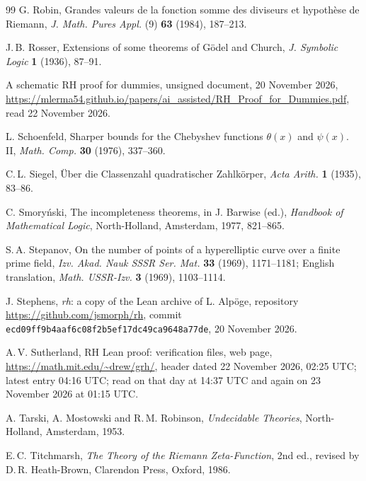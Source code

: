 \documentclass[11pt]{article}
\theoremstyle{definition}
\theoremstyle{remark}
\begin{document}
\begin{thebibliography}{99}
 G. Robin, Grandes valeurs de la fonction somme des diviseurs et hypoth\`ese de Riemann, \emph{J. Math. Pures Appl.} (9) \textbf{63} (1984), 187--213.

 J.\,B. Rosser, Extensions of some theorems of G\"odel and Church, \emph{J. Symbolic Logic} \textbf{1} (1936), 87--91.

 A schematic RH proof for dummies, unsigned document, 20 November 2026, \url{https://mlerma54.github.io/papers/ai_assisted/RH_Proof_for_Dummies.pdf}, read 22 November 2026.

 L. Schoenfeld, Sharper bounds for the Chebyshev functions $\theta(x)$ and $\psi(x)$. II, \emph{Math. Comp.} \textbf{30} (1976), 337--360.

 C.\,L. Siegel, \"Uber die Classenzahl quadratischer Zahlk\"orper, \emph{Acta Arith.} \textbf{1} (1935), 83--86.

 C. Smory\'nski, The incompleteness theorems, in J. Barwise (ed.), \emph{Handbook of Mathematical Logic}, North-Holland, Amsterdam, 1977, 821--865.

 S.\,A. Stepanov, On the number of points of a hyperelliptic curve over a finite prime field, \emph{Izv. Akad. Nauk SSSR Ser. Mat.} \textbf{33} (1969), 1171--1181; English translation, \emph{Math. USSR-Izv.} \textbf{3} (1969), 1103--1114.

 J. Stephens, \emph{rh}: a copy of the Lean archive of L. Alp\"oge, repository \url{https://github.com/jsmorph/rh}, commit \nolinkurl{ecd09ff9b4aaf6c08f2b5ef17dc49ca9648a77de}, 20 November 2026.

 A.\,V. Sutherland, RH Lean proof: verification files, web page, \url{https://math.mit.edu/~drew/grh/}, header dated 22 November 2026, 02:25 UTC; latest entry 04:16 UTC; read on that day at 14:37 UTC and again on 23 November 2026 at 01:15 UTC.

 A. Tarski, A. Mostowski and R.\,M. Robinson, \emph{Undecidable Theories}, North-Holland, Amsterdam, 1953.

 E.\,C. Titchmarsh, \emph{The Theory of the Riemann Zeta-Function}, 2nd ed., revised by D.\,R. Heath-Brown, Clarendon Press, Oxford, 1986.


\end{thebibliography}
\end{document}
